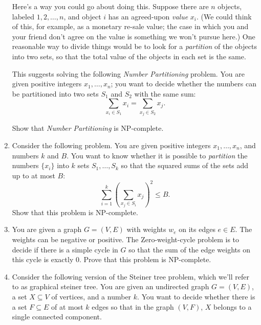 \documentclass[12pt]{article}
\begin{document}
\begin{enumerate}
Here's a way you could go about doing this.
Suppose there are $n$ objects, labeled $1, 2, \ldots, n$,
and object $i$ has an agreed-upon {\em value} $x_i$.
(We could think of this, for example, as a monetary re-sale value;
the case in which you and your friend don't agree on the
value is something we won't pursue here.)
One reasonable way to divide things would be to look
for a {\em partition} of the objects into two sets,
so that the total value of the objects in each set is the same.

This suggests solving the following
{\em Number Partitioning} problem.
You are given positive integers $x_1, \ldots, x_n$;
you want to decide whether 
the numbers can be partitioned into
two sets $S_1$ and $S_2$ with the same sum:
$$\sum_{x_i \in S_1} x_i = \sum_{x_j \in S_2} x_j.$$

Show that {\em Number Partitioning} is NP-complete.


\item 

Consider the following problem.
You are given positive integers $x_1, \ldots, x_n$, and
numbers $k$ and $B$.
You want to know whether it is possible to {\em partition}
the numbers $\{x_i\}$ into $k$ sets $S_1, \ldots, S_k$
so that the squared sums of the sets add up to at most $B$:
$$\sum_{i=1}^k \left(\sum_{x_j \in S_i} x_j \right)^2 \leq B.$$
Show that this problem is NP-complete.


\item 

You are given a graph $G=(V,E)$
with weights $w_e$ on its edges $e \in E$. The weights can be negative
or positive. The {\sc Zero-weight-cycle} problem is to decide if there
is a simple cycle in $G$ so that the sum of the
edge weights on this cycle is exactly $0$.
Prove that this problem is NP-complete.



\item 

Consider the following version of the Steiner tree
problem, which we'll refer to as {\sc graphical steiner tree}.
You are given an undirected graph $G = (V,E)$,
a set $X \subseteq V$ of vertices, and a number $k$.
You want to decide whether there is a set $F \subseteq E$ of at
most $k$ edges so that in the graph $(V,F)$,
$X$ belongs to a single connected component.


\end{enumerate}
\end{document}
